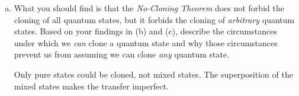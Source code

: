 \documentclass[10pt,letterpaper]{article}
\begin{document}
\begin{enumerate}
\begin{enumerate}[a)]
\color{violet}
The tensor product of the two states would result in
\begin{gather*}
\ket{\psi'} = \begin{bmatrix}
\frac{1}{\sqrt{2}} \\
\frac{1}{\sqrt{2}}
\end{bmatrix} \otimes \begin{bmatrix}
\frac{1}{\sqrt{2}} \\
\frac{1}{\sqrt{2}} 
\end{bmatrix} = \begin{bmatrix}
\frac{1}{2} \\
\frac{1}{2} \\
\frac{1}{2} \\
\frac{1}{2} 
\end{bmatrix}
\end{gather*}
Then, attempting that with a CNOT gate would get
\begin{gather*}
CNOT\left( \begin{bmatrix}
\frac{1}{\sqrt{2}} \\
\frac{1}{\sqrt{2}} 
\end{bmatrix} \otimes \begin{bmatrix}
1 \\
0 
\end{bmatrix} \right) = CNOT\left( \begin{bmatrix}
\frac{1}{\sqrt{2}} \\
0 \\
\frac{1}{\sqrt{2}} \\
0 
\end{bmatrix} \right) = \begin{bmatrix}
\frac{1}{\sqrt{2}} \\
0 \\
0 \\
\frac{1}{\sqrt{2}} 
\end{bmatrix}
\end{gather*}
which is not the same quantum state. Hence, the CNOT did not clone that state. 
\color{black}

\item What you should find is that the \textit{No-Cloning Theorem} does not forbid the cloning of all quantum states, but it forbids the cloning of \textit{arbitrary} quantum states. Based on your findings in (b) and (c), describe the circumstances under which we \textit{can} clone a quantum state and why those circumstances prevent us from assuming we can clone \textit{any} quantum state.

\color{violet}
Only pure states could be cloned, not mixed states. The superposition of the mixed states makes the transfer imperfect. 
\color{black}

\end{enumerate}

\end{enumerate}
	
\end{document}
